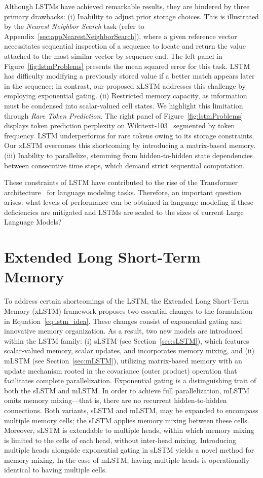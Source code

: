 Although LSTMs have achieved remarkable results, they are hindered by three primary drawbacks: (i) Inability to adjust prior storage choices. This is illustrated by the {\it Nearest Neighbor Search} task (refer to Appendix~\ref{sec:appNearestNeighborSearch}), where a given reference vector necessitates sequential inspection of a sequence to locate and return the value attached to the most similar vector by sequence end. The left panel in Figure~\ref{fig:lstmProblems} presents the mean squared error for this task. LSTM has difficulty modifying a previously stored value if a better match appears later in the sequence; in contrast, our proposed xLSTM addresses this challenge by employing exponential gating. (ii) Restricted memory capacity, as information must be condensed into scalar-valued cell states. We highlight this limitation through {\it Rare Token Prediction}. The right panel of Figure~\ref{fig:lstmProblems} displays token prediction perplexity on Wikitext-103~\citep{Merity:17} segmented by token frequency. LSTM underperforms for rare tokens owing to its storage constraints. Our xLSTM overcomes this shortcoming by introducing a matrix-based memory. (iii) Inability to parallelize, stemming from hidden-to-hidden state dependencies between consecutive time steps, which demand strict sequential computation.

These constraints of LSTM have contributed to the rise of the Transformer architecture~\citep{Vaswani:17} for language modeling tasks. Therefore, an important question arises: what levels of performance can be obtained in language modeling if these deficiencies are mitigated and LSTMs are scaled to the sizes of current Large Language Models?

\section{Extended Long Short-Term Memory}
\label{sec:xLSTM}

To address certain shortcomings of the LSTM, the Extended Long Short-Term Memory (xLSTM) framework proposes two essential changes to the formulation in Equation~\eqref{eq:lstm_idea}. These changes consist of exponential gating and innovative memory organization. As a result, two new models are introduced within the LSTM family: (i) sLSTM (see Section~\ref{sec:sLSTM}), which features scalar-valued memory, scalar updates, and incorporates memory mixing, and (ii) mLSTM (see Section~\ref{sec:mLSTM}), utilizing matrix-based memory with an update mechanism rooted in the covariance (outer product) operation that facilitates complete parallelization. Exponential gating is a distinguishing trait of both the sLSTM and mLSTM. In order to achieve full parallelization, mLSTM omits memory mixing—that is, there are no recurrent hidden-to-hidden connections. Both variants, sLSTM and mLSTM, may be expanded to encompass multiple memory cells; the sLSTM applies memory mixing between these cells. Moreover, sLSTM is extendable to multiple heads, within which memory mixing is limited to the cells of each head, without inter-head mixing. Introducing multiple heads alongside exponential gating in sLSTM yields a novel method for memory mixing. In the case of mLSTM, having multiple heads is operationally identical to having multiple cells.

